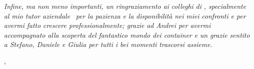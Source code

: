 \noindent \textit{Infine, ma non meno importanti, un ringraziamento ai colleghi di \myCompany, specialmente al mio tutor aziendale \myTutor\ per la pazienza e la disponibilità nei miei confronti e per avermi fatto crescere professionalmente; grazie ad Andrei per avermi accompagnato alla scoperta del fantastico mondo dei \textit{container} e un grazie sentito a Stefano, Daniele e Giulia per tutti i bei momenti trascorsi assieme.}\\
\bigskip

\noindent\textit{\myLocation, \myTime}
\hfill \myName

\endgroup

